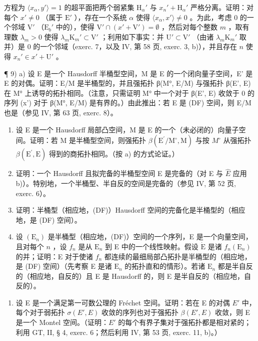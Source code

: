 方程为 \(\langle x_{\alpha}, y' \rangle = 1\) 的超平面把两个弱紧集 \(\mathrm{H}_{\alpha}'\) 与 \(x_{n}' + \mathrm{H}_{\alpha}'\) 严格分离。证明：对每个 \(x' \neq 0\) （属于 \(\mathrm{E}'\) ），存在一个系统 \(\alpha\) 使得 \(\langle x_{\alpha}, x' \rangle \neq 0\) 。为此，考虑 0 的一个邻域 \(\mathrm{V}'\) （\(\mathrm{E}_b'\) 中的），使得 \(\mathrm{V}' \cap (x' + \mathrm{V}') = \emptyset\) ，然后对每个整数 \(m\) ，取有理数 \(\lambda_m > 0\) 使得 \(\lambda_m \mathrm{K}_m' \subset \mathrm{V}'\) ；利用如下事实：并 \(\mathrm{U}' \subset \mathrm{V}'\) （由诸 \(\lambda_m \mathrm{K}_m'\) 取并）是 0 的一个邻域（exerc. 7，以及 IV, 第 58 页, exerc. 3, b)），并且存在 \(n\) 使得 \(x_n' \in x' + \mathrm{U}'\) 。

¶ 9) a) 设 E 是一个 Hausdorff 半桶型空间，M 是 E 的一个闭向量子空间，E' 是 E 的对偶。证明：E/M 是半桶型的，并且强拓扑 β(M°, E/M) 与强拓扑 β(E', E) 在 M° 上诱导的拓扑相同。（注意，只需证明 M° 中一个对于 β(E', E) 收敛于 0 的序列 (x') 对于 β(M°, E/M) 是有界的。）由此推出：若 E 是 (DF) 空间，则 E/M 也是（参见 IV, 第 63 页, exerc. 8）。

\begin{enumerate}
\def\labelenumi{\alph{enumi})}
\setcounter{enumi}{1}
\item
  设 E 是一个 Hausdorff 局部凸空间，M 是 E 的一个（未必闭的）向量子空间。证明：若 M 是半桶型空间，则强拓扑 \(\beta(\mathrm{E}^{\prime}/\mathrm{M}^{\circ}, \mathrm{M})\) 与按 \(M^{\circ}\) 从强拓扑 \(\beta(\mathrm{E}^{\prime}, \mathrm{E})\) 得到的商拓扑相同。（按 a) 的方式论证。）
\item
  证明：一个 Hausdorff 且拟完备的半桶型空间 E 是完备的（对 E 与 \(\hat{E}\) 应用 b)）。特别地，一个半桶型、半自反的空间是完备的（参见 IV, 第 52 页, exerc. 6）。
\item
  证明：半桶型（相应地，(DF)）Hausdorff 空间的完备化是半桶型的（相应地，是 (DF) 空间）。
\item
  设 \((\mathrm{E}_n)\) 是半桶型（相应地，(DF)）空间的一个序列，E 是一个向量空间，且对每个 \(n\) ，设 \(f_n\) 是从 \(\mathrm{E}_n\) 到 E 中的一个线性映射。假设 \(\dot{\mathrm{E}}\) 是诸 \(f_n(\mathrm{E}_n)\) 的并；证明：E 对于使诸 \(f_n\) 都连续的最细局部凸拓扑是半桶型的（相应地，是 (DF) 空间）（先考察 E 是诸 \(\mathrm{E}_n\) 的拓扑直和的情形）。若诸 \(\mathrm{E}_n\) 都是半自反的（相应地，自反的）且 E 是 Hausdorff 的，则 E 是半自反的（相应地，自反的）。
\end{enumerate}

\begin{enumerate}
\def\labelenumi{\arabic{enumi})}
\setcounter{enumi}{9}
\tightlist
\item
  设 E 是一个满足第一可数公理的 Fréchet 空间。证明：若在 E 的对偶 \(E'\) 中，每个对于弱拓扑 \(\sigma(E', E)\) 收敛的序列也对于强拓扑 \(\beta(E', E)\) 收敛，则 E 是一个 Montel 空间。（证明：\(E'\) 的每个有界子集对于强拓扑都是相对紧的；利用 GT, II, § 4, exerc. 6；然后利用 IV, 第 53 页, exerc. 11, b)。）
\end{enumerate}

